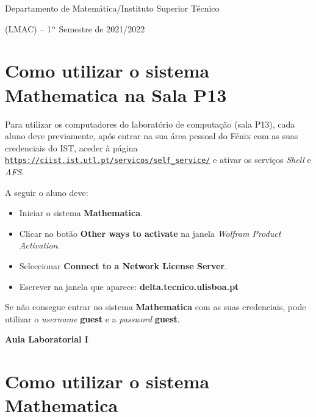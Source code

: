 \documentclass[11pt]{article}
\begin{document}

\noindent Departamento de  Matem\'atica/Instituto Superior
T\'ecnico \vspace{3mm}

 ({\small LMAC}) -- 1$^{\rm o}$ Semestre de 2021/2022\\

\section{Como utilizar o sistema  Mathematica  na Sala P13}

\noindent
Para utilizar os computadores do laborat\'orio de computa\c{c}\~ao (sala P13), cada aluno deve previamente, ap\'os entrar na sua \'area pessoal do F\'enix  com as suas credenciais do IST, aceder \`a p\'agina  \texttt{\url{https://ciist.ist.utl.pt/servicos/self\_service/}}
e ativar os servi\c{c}os \emph{Shell} e \emph{AFS}.

\medskip

\noindent
A seguir o aluno deve:

\begin{itemize} 

\item  Iniciar o sistema \textbf{Mathematica}. 
\item Clicar no bot\~ao \textbf{Other ways to activate} na janela \emph{Wolfram Product Activation}.
\item Seleccionar \textbf{Connect to a Network License Server}. 

\item Escrever na janela que aparece:  \textbf{delta.tecnico.ulisboa.pt}

\end{itemize}

\noindent
Se n\~ao consegue entrar no sistema \textbf{Mathematica} com as suas credenciais, pode utilizar o \emph{username} \textbf{guest} e a \emph{password} \textbf{guest}. 


\pagebreak

\begin{center}
{\bf   \Large{Aula Laboratorial I}} \vspace{6mm}
\end{center}

\section{Como utilizar o sistema  Mathematica}
\end{document}
